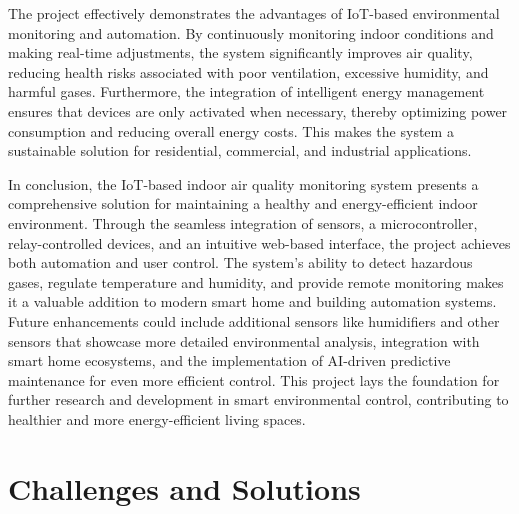 \documentclass[a4paper]{scrartcl}
\begin{document}
The project effectively demonstrates the advantages of IoT-based environmental monitoring and automation. By continuously monitoring indoor conditions and making real-time adjustments, the system significantly improves air quality, reducing health risks associated with poor ventilation, excessive humidity, and harmful gases. Furthermore, the integration of intelligent energy management ensures that devices are only activated when necessary, thereby optimizing power consumption and reducing overall energy costs. This makes the system a sustainable solution for residential, commercial, and industrial applications.

In conclusion, the IoT-based indoor air quality monitoring system presents a comprehensive solution for maintaining a healthy and energy-efficient indoor environment. Through the seamless integration of sensors, a microcontroller, relay-controlled devices, and an intuitive web-based interface, the project achieves both automation and user control. The system's ability to detect hazardous gases, regulate temperature and humidity, and provide remote monitoring makes it a valuable addition to modern smart home and building automation systems. Future enhancements could include additional sensors like humidifiers and other sensors that showcase more detailed environmental analysis, integration with smart home ecosystems, and the implementation of AI-driven predictive maintenance for even more efficient control. This project lays the foundation for further research and development in smart environmental control, contributing to healthier and more energy-efficient living spaces.

\section{Challenges and Solutions}
\end{document}

